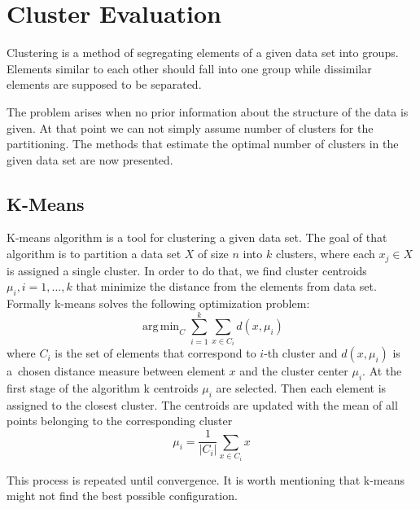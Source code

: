 \documentclass{mini}
\DeclareMathOperator*{\argmin}{arg\,min} %
\begin{document}
\section{Cluster Evaluation} \label{sec::cluster}

Clustering is a method of segregating elements of a given data set into groups. Elements similar to each other should fall into one group while dissimilar elements are supposed to be separated.

The problem arises when no prior information about the structure of the data is given. At that point we can not simply assume number of clusters for the partitioning. The methods that estimate the optimal number of clusters in the given data set are now presented.

\subsection{K-Means}

K-means algorithm is a tool for clustering a given data set.
The goal of that algorithm is to partition a data set $X$ of size $n$ into $k$ clusters, where each $x_{j}\in X$ is assigned a single cluster. In order to do that, we find cluster centroids $\mu_{i}, i=1,\ldots,k$ that minimize the distance from the elements from data set. Formally k-means solves the following optimization problem:
\begin{equation}
    \argmin_{C}\sum_{i=1}^{k}\sum_{x\in C_{i}} d(x,\mu_{i})
\end{equation}
where $C_{i}$ is the set of elements that correspond to $i$-th cluster and $d(x,\mu_{i})$ is a~chosen distance measure between element $x$ and the cluster center $\mu_{i}$. At the first stage of the algorithm k centroids $\mu_{i}$ are selected. Then each element is assigned to the closest cluster. The centroids are updated with the mean of all points belonging to the corresponding cluster
\begin{equation}
    \mu_{i} = \frac{1}{|C_{i}|} \sum_{x\in C_{i}} x
\end{equation}

This process is repeated until convergence. It is worth mentioning that k-means might not find the best possible 
configuration.
\end{document}
